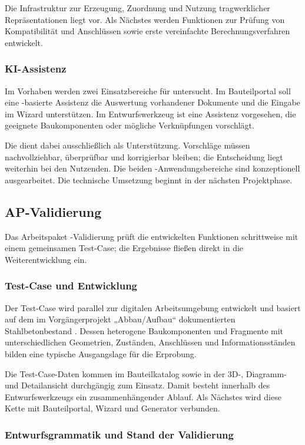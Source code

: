 \documentclass[type=zwischenbericht]{zukunftbau}
\begin{document}
Die Infrastruktur zur Erzeugung, Zuordnung und Nutzung tragwerklicher Repräsentationen liegt vor. Als Nächstes werden Funktionen zur Prüfung von Kompatibilität und Anschlüssen sowie erste vereinfachte Berechnungsverfahren entwickelt.

\subsubsection{KI-Assistenz}
Im Vorhaben werden zwei Einsatzbereiche für  untersucht. Im Bauteilportal soll eine -basierte Assistenz die Auswertung vorhandener Dokumente und die Eingabe im Wizard unterstützen. Im Entwurfswerkzeug ist eine Assistenz vorgesehen, die geeignete Baukomponenten oder mögliche Verknüpfungen vorschlägt.

Die  dient dabei ausschließlich als Unterstützung. Vorschläge müssen nachvollziehbar, überprüfbar und korrigierbar bleiben; die Entscheidung liegt weiterhin bei den Nutzenden. Die beiden -Anwendungsbereiche sind konzeptionell ausgearbeitet. Die technische Umsetzung beginnt in der nächsten Projektphase.

\subsection{AP-Validierung}

Das Arbeitspaket -Validierung prüft die entwickelten Funktionen schrittweise mit einem gemeinsamen Test-Case; die Ergebnisse fließen direkt in die Weiterentwicklung ein.

\subsubsection{Test-Case und Entwicklung}
Der Test-Case wird parallel zur digitalen Arbeitsumgebung entwickelt und basiert auf dem im Vorgängerprojekt „Abbau/Aufbau“ dokumentierten Stahlbetonbestand \cite{henschel-abbau-aufbau-2020}. Dessen heterogene Baukomponenten und Fragmente mit unterschiedlichen Geometrien, Zuständen, Anschlüssen und Informationsständen bilden eine typische Ausgangslage für die Erprobung.

Die Test-Case-Daten kommen im Bauteilkatalog sowie in der 3D-, Diagramm- und Detailansicht durchgängig zum Einsatz. Damit besteht innerhalb des Entwurfswerkzeugs ein zusammenhängender Ablauf. Als Nächstes wird diese Kette mit Bauteilportal, Wizard und Generator verbunden.

\subsubsection{Entwurfsgrammatik und Stand der Validierung}
\end{document}

